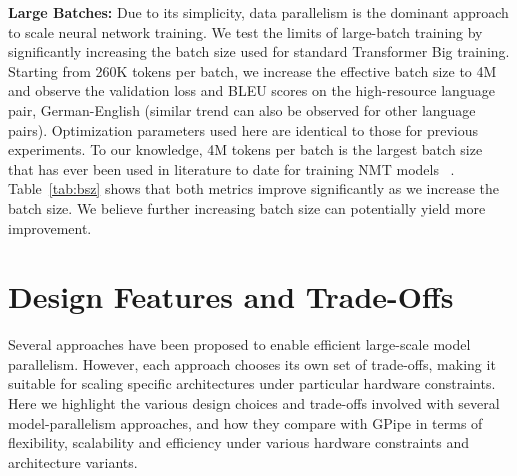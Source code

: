 \documentclass{article}
\def\codename{GPipe}
\begin{document}
\textbf{Large Batches:} Due to its simplicity, data parallelism is the dominant approach to scale neural network training\cite{DBLP:journals/corr/KeskarMNST16, DBLP:journals/corr/abs-1711-00489}. We test the limits of large-batch training by significantly increasing the batch size used for standard Transformer Big training. Starting from 260K tokens per batch, we increase the effective batch size to 4M and observe the validation loss and BLEU scores on the high-resource language pair, German-English (similar trend can also be observed for other language pairs). Optimization parameters used here are identical to those for previous experiments. 
To our knowledge, 4M tokens per batch is the largest batch size that has ever been used in literature to date for training NMT models ~\cite{ott-etal-2018-scaling}. Table~\ref{tab:bsz} shows that both metrics improve significantly as we increase the batch size. We believe further increasing batch size can potentially yield more improvement.



\section{Design Features and Trade-Offs}

Several approaches have been proposed to enable efficient large-scale model parallelism. However, each approach chooses its own set of trade-offs, making it suitable for scaling specific architectures under particular hardware constraints. Here we highlight the various design choices and trade-offs involved with several model-parallelism approaches, and how they compare with \codename{} in terms of flexibility, scalability and efficiency under various hardware constraints and architecture variants.

\end{document}
